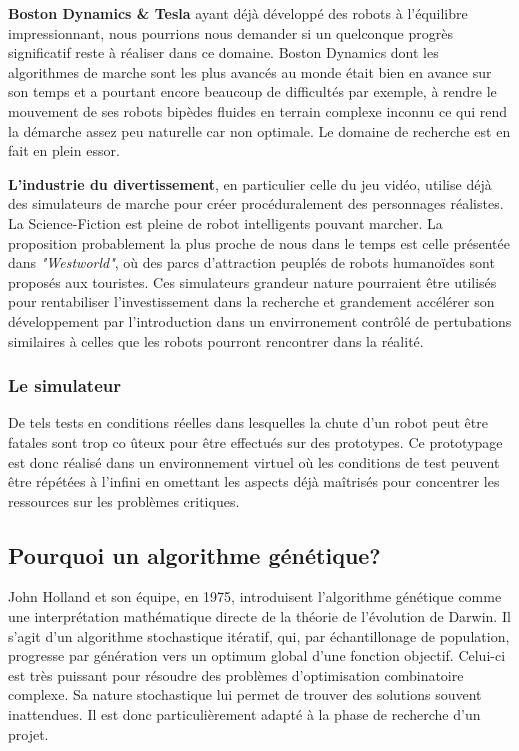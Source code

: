 \documentclass[journal, a4paper]{IEEEtran}
\begin{document}
	\textbf{Boston Dynamics \& Tesla} ayant déjà développé des robots
	à l'équilibre impressionnant, nous pourrions nous demander si un
	quelconque progrès significatif reste à réaliser dans ce domaine.
	Boston Dynamics dont les algorithmes de marche sont les plus
	avancés au monde était bien en avance sur son temps et a pourtant
	encore beaucoup de difficultés par exemple, à rendre le mouvement
	de
	ses robots
	bipèdes fluides en terrain complexe inconnu ce qui rend la démarche
	assez peu naturelle car non optimale. Le
	domaine de recherche est en fait en plein essor.

	\textbf{L'industrie du divertissement}, en particulier celle du
	jeu vidéo,
	utilise déjà des simulateurs de marche pour créer procéduralement
	des personnages
	 réalistes.
	La Science-Fiction est pleine de robot intelligents pouvant
	marcher.
	La proposition probablement la plus proche de nous dans le
	temps est celle présentée dans \textit{"Westworld"}, où des parcs
	d'attraction peuplés de robots humanoïdes sont proposés aux
	touristes. Ces simulateurs grandeur nature pourraient être
	utilisés pour rentabiliser l'investissement dans la recherche
	et grandement accélérer son développement par l'introduction dans
	un envirronement contrôlé de
	pertubations similaires à celles que les robots pourront rencontrer
	dans
	la réalité.

	\subsubsection{Le simulateur}
	De tels tests en conditions réelles dans lesquelles la chute
	d'un robot peut être fatales sont trop co
	ûteux
	pour être effectués sur des prototypes.
	Ce prototypage est donc réalisé dans un environnement virtuel où les
	conditions de test peuvent être répétées à l'infini en omettant les
	aspects déjà maîtrisés pour concentrer les ressources sur les
	problèmes critiques.

	\subsection{Pourquoi un algorithme génétique?}\label{subsec:pourquoi-un-algorithme-genetique?}
	John Holland et son équipe, en 1975, introduisent
	l'algorithme génétique comme une
	interprétation mathématique directe de la théorie de l'évolution de
	Darwin\cite{systems-adaptation}.
	Il s'agit d'un algorithme stochastique itératif, qui, par
	échantillonage de population, progresse par génération
	vers	un optimum global d’une fonction objectif.
	Celui-ci est très puissant pour résoudre des problèmes
	d'optimisation combinatoire complexe.
	Sa nature stochastique lui permet de trouver des solutions souvent
	inattendues. Il est donc particulièrement adapté à la phase de
	recherche d'un projet.
\end{document}
